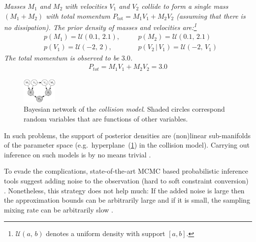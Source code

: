 \documentclass[letterpaper]{article}
\newcommand{\pr}{p}
\begin{document}
\emph{
Masses $M_1$ and $M_2$ with velocities $V_1$ and $V_2$ collide to form a single mass $(M_1 + M_2)$ with total momentum 
$P_\text{tot} = M_1 V_1 + M_2 V_2$ (assuming that there is no dissipation).
The prior density of masses and velocities are:\footnote{
$\mathcal{U}(a, \, b)$ denotes a uniform density with support $[a,b]$.}
\begin{align*}
&\pr(M_1) = \mathcal{U}(0.1, \, 2.1), \quad 
&&\pr(M_2) \!=\! \mathcal{U}(0.1, \, 2.1)\\
&\pr(V_1) = \mathcal{U}(-2, \, 2), \quad
&&\pr(V_2 \, | \, V_1) = \mathcal{U}(-2, \, V_1)
\end{align*}
The total momentum is observed to be $3.0$.
\begin{align}\label{f:p_tot}
P_{tot} = M_1 V_1 + M_2 V_2 = 3.0
\end{align}
}%

\begin{figure}
\center
\includegraphics[width=0.15\textwidth]{Figs/little-momentum1.pdf} 
\vspace{-2mm}
\caption{\footnotesize Bayesian network of the \emph{collision model}. Shaded circles correspond random variables that are functions of other variables.}
\label{fig:collision.bn}
\vspace{-5mm}
\end{figure}



 

In such problems, the support of posterior densities are (non)linear sub-manifolds of the parameter space (e.g.\ hyperplane~(\ref{fig:collision.bn}) in the collision model). 
Carrying out inference on such models is by no means trivial \cite{pennec2006intrinsic}. 

To evade the complications, state-of-the-art MCMC based probabilistic inference tools suggest adding noise to the observation (hard to soft constraint conversion) \cite{wood2014new}. 
Nonetheless, this strategy does not help much: If the added noise is large then the approximation bounds can be arbitrarily large and if it is small, the sampling mixing rate can be arbitrarily slow \cite{li2013dynamic,chin1987bayesian}. 
 
\end{document}
